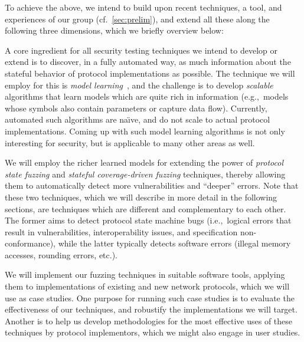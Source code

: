 \documentclass[11pt]{article}
\newcommand{\eg}{e.\/g.,\ }
\newcommand{\ie}{i.\/e.,\ }
\begin{document}
To achieve the above, we intend to build upon recent techniques, a tool, and
experiences of our group (cf.\ \cref{sec:prelim}), and extend all these along
the following three dimensions, which we briefly overview below:
\begin{description}[itemsep=-0.5mm]
\item[Algorithmic Improvements to Model Learning] A core ingredient for all
  security testing techniques we intend to develop or extend is to discover,
  in a fully automated way, as much information about the stateful behavior of
  protocol implementations as possible. The technique we will employ for this
  is \emph{model learning}~\cite{Angluin1987,Vaandrager@CACM-17}, and the
  challenge is to develop \emph{scalable} algorithms that learn models which
  are quite rich in information (\eg models whose symbols also contain
  parameters or capture data flow). Currently, automated such algorithms are
  na{\"\i}ve, and do not scale to actual protocol implementations. Coming up
  with such model learning algorithms is not only interesting for security,
  but is applicable to many other areas as well.
\item[Effective Stateful Fuzzing Techniques] We will employ the richer
  learned models for extending the power of \emph{protocol state fuzzing} and
  \emph{stateful coverage-driven fuzzing} techniques, thereby allowing them
  to automatically detect more vulnerabilities and ``deeper'' errors. Note that
  these two techniques, which we will describe in more detail in the following
  sections, are techniques which are different and complementary to each
  other. The former aims to detect protocol state machine bugs (\ie logical
  errors that result in vulnerabilities, interoperability issues, and
  specification non-conformance), while the latter typically detects software
  errors (illegal memory accesses, rounding errors, etc.).
\item[Tools, Case Studies, and Methodologies] We will implement our fuzzing
  techniques in suitable software tools, applying them to implementations of
  existing and new network protocols, which we will use as case studies. One
  purpose for running such case studies is to evaluate the effectiveness of
  our techniques, and robustify the implementations we will target. Another is
  to help us develop methodologies for the most effective uses of these
  techniques by protocol implementors, which we might also engage in user
  studies.
\end{description}
\end{document}
